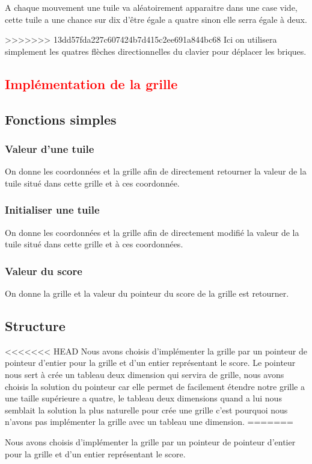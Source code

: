 \documentclass{article}
\begin{document}
A chaque mouvement une tuile va aléatoirement apparaitre dans une case vide, cette tuile a une chance sur dix d'être égale a quatre sinon elle serra égale à deux.

>>>>>>> 13dd57fda227c607424b7d415c2ee691a844bc68
Ici on utilisera simplement les quatres flèches directionnelles du clavier pour déplacer les briques.
\textcolor{red}{\section{Implémentation de la grille}}
\subsection{Fonctions simples}
\subsubsection{Valeur d'une tuile}
On donne les coordonnées et la grille afin de directement retourner la valeur de la tuile situé dans cette grille et à ces coordonnée.
\subsubsection{Initialiser une tuile}
On donne les coordonnées et la grille afin de directement modifié la valeur de la tuile situé dans cette grille et à ces coordonnées.
\subsubsection{Valeur du score}
On donne la grille et la valeur du pointeur du score de la grille est retourner.
\subsection{Structure}
<<<<<<< HEAD
Nous avons choisis d'implémenter la grille par un pointeur de pointeur d'entier pour la grille et d'un entier représentant le score. Le pointeur nous sert à crée un tableau deux dimension qui servira de grille, nous avons choisis la solution du pointeur car elle permet de facilement étendre notre grille a une taille supérieure a quatre, le tableau deux dimensions quand a lui nous semblait la solution la plus naturelle pour crée une grille c'est pourquoi nous n'avons pas implémenter la grille avec un tableau une dimension.
=======

Nous avons choisis d'implémenter la grille par un pointeur de pointeur d'entier pour la grille et d'un entier représentant le score.
\end{document}
